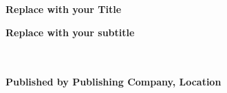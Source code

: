 \thispagestyle{empty}


\vspace{3cm}
  \begin{center}
	\bfseries \sffamily \Huge Replace with your Title\par
	\bfseries \LARGE Replace with your subtitle\par
~\\
	~\\
	\bfseries \small Published by Publishing Company, Location\par
	

\end{center}
